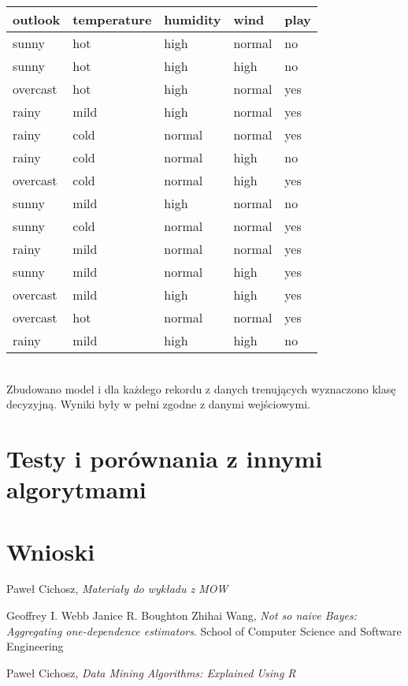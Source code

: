 \documentclass[16]{article}
\begin{document}
\begin{tabular}{ |l|l|l|l|l| }
\hline
outlook & temperature & humidity & wind & play
\\ \hline
sunny & hot & high & normal & no
\\ \hline
sunny & hot & high & high & no
\\ \hline
overcast & hot & high & normal & yes
\\ \hline
rainy & mild & high & normal & yes
\\ \hline
rainy & cold & normal & normal & yes
\\ \hline
rainy & cold & normal & high & no
\\ \hline
overcast & cold & normal & high & yes
\\ \hline
sunny & mild & high & normal & no
\\ \hline
sunny & cold & normal & normal & yes
\\ \hline
rainy & mild & normal & normal & yes
\\ \hline
sunny & mild & normal & high & yes
\\ \hline
overcast & mild & high & high & yes
\\ \hline
overcast & hot & normal & normal & yes
\\ \hline
rainy & mild & high & high & no
\\ \hline
\end{tabular}\\

Zbudowano model i dla każdego rekordu z danych trenujących wyznaczono klasę decyzyjną. Wyniki były w pełni zgodne z danymi wejściowymi. 



\section{Testy i porównania z innymi algorytmami}
\section{Wnioski}


\begin{thebibliography}{9}
	
		Paweł Cichosz,
		\emph{Materiały do wykładu z MOW}
			
		Geoffrey I. Webb
		Janice R. Boughton
		Zhihai Wang,
		\emph{Not so naive Bayes: Aggregating one-dependence estimators}.
		School of Computer Science and Software Engineering
    
		Paweł Cichosz,
		\emph{Data Mining Algorithms: Explained Using R}
\end{thebibliography}
\end{document}
